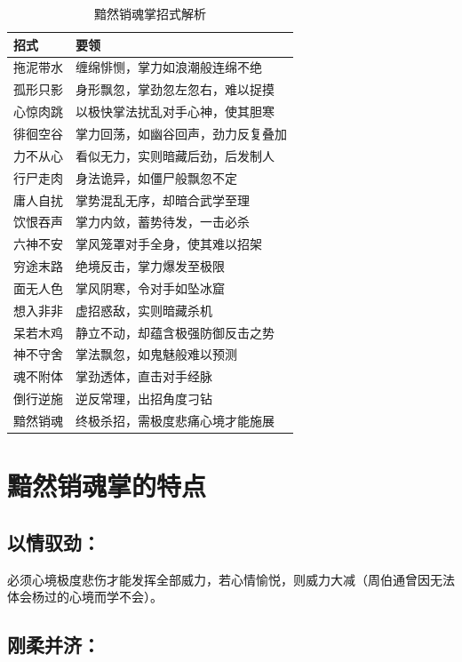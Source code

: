 \documentclass[doctor, vlined, ]{DissertUESTC}
\begin{document}
	\begin{table}[!h]
		\caption{黯然销魂掌招式解析}
		\begin{tabular}{l l}
			\toprule
			\textbf{招式} & \textbf{要领} \\
			\midrule
			拖泥带水 & 缠绵悱恻，掌力如浪潮般连绵不绝 \\
			孤形只影 & 身形飘忽，掌劲忽左忽右，难以捉摸 \\
			心惊肉跳 & 以极快掌法扰乱对手心神，使其胆寒 \\
			徘徊空谷 & 掌力回荡，如幽谷回声，劲力反复叠加 \\
			力不从心 & 看似无力，实则暗藏后劲，后发制人 \\
			行尸走肉 & 身法诡异，如僵尸般飘忽不定 \\
			庸人自扰 & 掌势混乱无序，却暗合武学至理 \\
			饮恨吞声 & 掌力内敛，蓄势待发，一击必杀 \\
			六神不安 & 掌风笼罩对手全身，使其难以招架 \\
			穷途末路 & 绝境反击，掌力爆发至极限 \\
			面无人色 & 掌风阴寒，令对手如坠冰窟 \\
			想入非非 & 虚招惑敌，实则暗藏杀机 \\
			呆若木鸡 & 静立不动，却蕴含极强防御反击之势 \\
			神不守舍 & 掌法飘忽，如鬼魅般难以预测 \\
			魂不附体 & 掌劲透体，直击对手经脉 \\
			倒行逆施 & 逆反常理，出招角度刁钻 \\
			黯然销魂 & 终极杀招，需极度悲痛心境才能施展 \\
			\bottomrule
		\end{tabular}
	\end{table}

	\section{黯然销魂掌的特点}

	\subsection{以情驭劲：}

	必须心境极度悲伤才能发挥全部威力，若心情愉悦，则威力大减（周伯通曾因无法体会杨过的心境而学不会）。

	\subsection{刚柔并济：}
\end{document}
